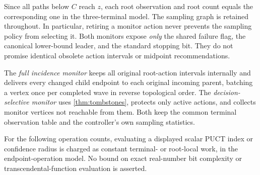 \documentclass{article}
\theoremstyle{plain}
\theoremstyle{definition}
\begin{document}
Since all paths below $C$ reach $z$, each root observation and root
count equals the corresponding one in the three-terminal model.
The sampling graph is retained throughout. In particular, retiring a
monitor action never prevents the sampling policy from selecting it.
Both monitors expose \emph{only} the shared failure flag, the canonical
lower-bound leader, and the standard stopping bit. They do not promise
identical obsolete action intervals or midpoint recommendations.

The \emph{full incidence monitor} keeps all original root-action
intervals internally and delivers every changed child endpoint to each
original incoming parent, batching a vertex once per completed wave
in reverse topological order. The \emph{decision-selective monitor}
uses \cref{thm:tombstones}, protects only active actions, and collects
monitor vertices not reachable from them. Both keep the common terminal
observation table and the controller's own sampling statistics.

For the following operation counts, evaluating a displayed scalar PUCT
index or confidence radius is charged as constant terminal- or root-local
work, in the endpoint-operation model. No bound on exact real-number
bit complexity or transcendental-function evaluation is asserted.
\end{document}
